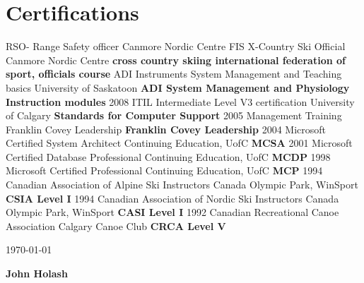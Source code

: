 \documentclass[]{friggeri-cv}
\begin{document}

\section{Certifications}
\begin{entrylist}
  {RSO- Range Safety officer}
  {Canmore Nordic Centre}
  {}
    {FIS X-Country Ski Official}
    {Canmore Nordic Centre}
    {\textbf{cross country skiing international federation of sport, officials course}}
    {ADI Instruments System Management and Teaching basics}
    {University of Saskatoon}
    {\textbf{ADI System Management and Physiology Instruction modules}}
  \entry
    {2008  }
    {ITIL Intermediate Level V3 certification}
    {University of Calgary}
    {\textbf{Standards for Computer Support}}
 \entry
   {2005}
   {Management Training}
   {Franklin Covey Leadership}
   {\textbf{Franklin Covey Leadership}  }
 \entry
   {2004}
   {Microsoft Certified System Architect}
   {Continuing Education, UofC}
   {\textbf{MCSA}  }
 \entry
   {2001}
   {Microsoft Certified Database Professional}
   {Continuing Education, UofC}
   {\textbf{MCDP}  }
 \entry
   {1998}
   {Microsoft Certified Professional}
   {Continuing Education, UofC}
   {\textbf{MCP}  }
 \entry
   {1994}
   {Canadian Association of Alpine Ski Instructors}
   {Canada Olympic Park, WinSport}
   {\textbf{CSIA Level I}  }
  \entry
   {1994}
   {Canadian Association of Nordic Ski Instructors}
   {Canada Olympic Park, WinSport}
   {\textbf{CASI Level I}  }
  \entry
   {1992}
   {Canadian Recreational Canoe Association}
   {Calgary Canoe Club}
   {\textbf{CRCA Level V}  }
   
\end{entrylist}


\begin{flushleft}
\today
\end{flushleft}
\begin{flushright}
\textbf{John Holash}
\end{flushright}
\end{document}
